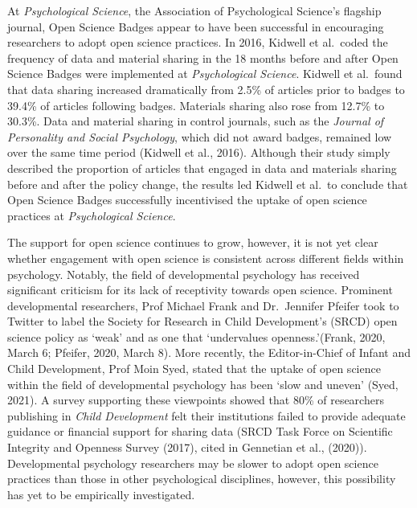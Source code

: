 \documentclass[
  english,
  man,floatsintext]{apa6}
\begin{document}
At \emph{Psychological Science}, the Association of Psychological Science's flagship journal, Open Science Badges appear to have been successful in encouraging researchers to adopt open science practices. In 2016, Kidwell et al.~coded the frequency of data and material sharing in the 18 months before and after Open Science Badges were implemented at \emph{Psychological Science}. Kidwell et al.~found that data sharing increased dramatically from 2.5\% of articles prior to badges to 39.4\% of articles following badges. Materials sharing also rose from 12.7\% to 30.3\%. Data and material sharing in control journals, such as the \emph{Journal of Personality and Social Psychology}, which did not award badges, remained low over the same time period (Kidwell et al., 2016). Although their study simply described the proportion of articles that engaged in data and materials sharing before and after the policy change, the results led Kidwell et al.~to conclude that Open Science Badges successfully incentivised the uptake of open science practices at \emph{Psychological Science}.

The support for open science continues to grow, however, it is not yet clear whether engagement with open science is consistent across different fields within psychology. Notably, the field of developmental psychology has received significant criticism for its lack of receptivity towards open science. Prominent developmental researchers, Prof Michael Frank and Dr.~Jennifer Pfeifer took to Twitter to label the Society for Research in Child Development's (SRCD) open science policy as `weak' and as one that `undervalues openness.'(Frank, 2020, March 6; Pfeifer, 2020, March 8). More recently, the Editor-in-Chief of Infant and Child Development, Prof Moin Syed, stated that the uptake of open science within the field of developmental psychology has been `slow and uneven' (Syed, 2021). A survey supporting these viewpoints showed that 80\% of researchers publishing in \emph{Child Development} felt their institutions failed to provide adequate guidance or financial support for sharing data (SRCD Task Force on Scientific Integrity and Openness Survey (2017), cited in Gennetian et al., (2020)). Developmental psychology researchers may be slower to adopt open science practices than those in other psychological disciplines, however, this possibility has yet to be empirically investigated.
\end{document}
